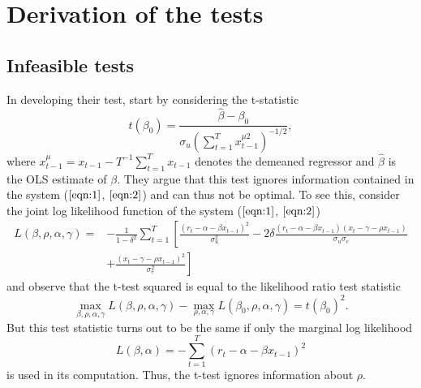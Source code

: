 \documentclass{article}
\begin{document}
\section{Derivation of the tests}
\label{Derivation of the tests}
\subsection{Infeasible tests}
\label{Infeasible tests}
In developing their test, \citet{campbell2006efficient} start by considering the t-statistic 
\begin{equation}
t\left(\beta_{0}\right)=\frac{\widehat{\beta}-\beta_{0}}{\sigma_{u}\left(\sum_{t=1}^{T} x_{t-1}^{\mu 2}\right)^{-1 / 2}},
\end{equation}
where $x_{t-1}^{\mu}=x_{t-1}-T^{-1} \sum_{t=1}^{T} x_{t-1}$ denotes the demeaned regressor and $\widehat{\beta}$ is the OLS estimate of $\beta$. They argue that this test ignores information contained in the system ($\ref{eqn:1}$, $\ref{eqn:2}$) and can thus not be optimal. To see this, consider the joint log likelihood function of the system ($\ref{eqn:1}$, $\ref{eqn:2}$)
\begin{equation}
\begin{aligned} L(\beta, \rho, \alpha, \gamma)=&-\frac{1}{1-\delta^{2}} \sum_{t=1}^{T}\left[\frac{\left(r_{t}-\alpha-\beta x_{t-1}\right)^{2}}{\sigma_{u}^{2}}-2 \delta \frac{\left(r_{t}-\alpha-\beta x_{t-1}\right)\left(x_{t}-\gamma-\rho x_{t-1}\right)}{\sigma_{u} \sigma_{e}}\right.\\ &\left.+\frac{\left(x_{t}-\gamma-\rho x_{t-1}\right)^{2}}{\sigma_{e}^{2}}\right] \end{aligned}
\end{equation}
and observe that the t-test squared is equal to the likelihood ratio test statistic
\begin{equation}
\max _{\beta, \rho, \alpha, \gamma} L(\beta, \rho, \alpha, \gamma)-\max _{\rho, \alpha, \gamma} L\left(\beta_{0}, \rho, \alpha, \gamma\right)=t\left(\beta_{0}\right)^{2}.
\end{equation}
But this test statistic turns out to be the same if only the marginal log likelihood 
\begin{equation}
L(\beta, \alpha)=-\sum_{t=1}^{T}\left(r_{t}-\alpha-\beta x_{t-1}\right)^{2}
\end{equation}
is used in its computation. Thus, the t-test ignores information about $\rho$.
\end{document}
